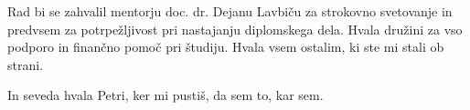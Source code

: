 








\begin{Acknowledgements}

Rad bi se zahvalil mentorju doc. dr. Dejanu Lavbiču za strokovno svetovanje in predvsem za potrpežljivost pri nastajanju diplomskega dela. Hvala družini za vso podporo in finančno pomoč pri študiju. Hvala vsem ostalim, ki ste mi stali ob strani.

In seveda hvala Petri, ker mi pustiš, da sem to, kar sem.
\end{Acknowledgements}
